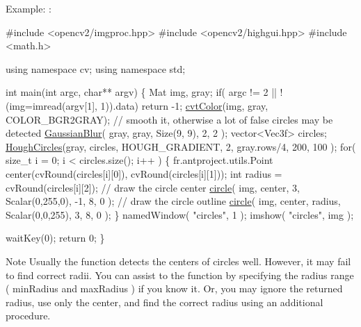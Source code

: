 Example\+: \+: 
\begin{DoxyPre}
\begin{DoxyCode}
\textcolor{preprocessor}{#include <opencv2/imgproc.hpp>}
\textcolor{preprocessor}{#include <opencv2/highgui.hpp>}
\textcolor{preprocessor}{#include <math.h>}

\textcolor{keyword}{using namespace }cv;
\textcolor{keyword}{using namespace }std;

\textcolor{keywordtype}{int} main(\textcolor{keywordtype}{int} argc, \textcolor{keywordtype}{char}** argv)
\{
    Mat img, gray;
    \textcolor{keywordflow}{if}( argc != 2 || !(img=imread(argv[1], 1)).data)
        \textcolor{keywordflow}{return} -1;
    \hyperlink{group__imgproc__misc_gaab99985581c43cce9df680e6586cb9ef}{cvtColor}(img, gray, COLOR\_BGR2GRAY);
    \textcolor{comment}{// smooth it, otherwise a lot of false circles may be detected}
    \hyperlink{group__imgproc__filter_gaf8f0c37e9b9c420a8edfc2753c8fe966}{GaussianBlur}( gray, gray, Size(9, 9), 2, 2 );
    vector<Vec3f> circles;
    \hyperlink{group__imgproc__feature_ga600228eea1d6673137492fb0d0c1b8d5}{HoughCircles}(gray, circles, HOUGH\_GRADIENT,
                 2, gray.rows/4, 200, 100 );
    \textcolor{keywordflow}{for}( \textcolor{keywordtype}{size\_t} i = 0; i < circles.size(); i++ )
    \{
         fr.antproject.utils.Point center(cvRound(circles[i][0]), cvRound(circles[i][1]));
         \textcolor{keywordtype}{int} radius = cvRound(circles[i][2]);
         \textcolor{comment}{// draw the circle center}
         \hyperlink{group__imgproc__draw_ga6f8e5000cb25b63d5885b12d46f52e39}{circle}( img, center, 3, Scalar(0,255,0), -1, 8, 0 );
         \textcolor{comment}{// draw the circle outline}
         \hyperlink{group__imgproc__draw_ga6f8e5000cb25b63d5885b12d46f52e39}{circle}( img, center, radius, Scalar(0,0,255), 3, 8, 0 );
    \}
    namedWindow( \textcolor{stringliteral}{"circles"}, 1 );
    imshow( \textcolor{stringliteral}{"circles"}, img );

    waitKey(0);
    \textcolor{keywordflow}{return} 0;
\}
\end{DoxyCode}
 \end{DoxyPre}
 

\begin{DoxyNote}{Note}
Usually the function detects the centers of circles well. However, it may fail to find correct radii. You can assist to the function by specifying the radius range ( min\+Radius and max\+Radius ) if you know it. Or, you may ignore the returned radius, use only the center, and find the correct radius using an additional procedure. 
\end{DoxyNote}

